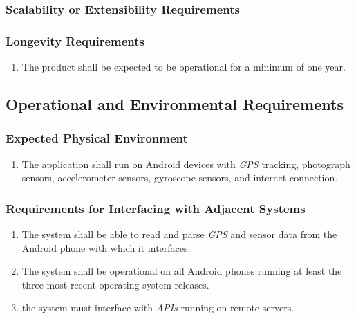 \documentclass[12pt,letterpaper]{article}
\begin{document}
\subsubsection{Scalability or Extensibility Requirements}
\label{ssub:scalability_or_extensibility_requirements}

\subsubsection{Longevity Requirements}
\label{ssub:longevity_requirements}
\begin{enumerate}[{PR-L}1. ]
	\item The product shall be expected to be operational for a minimum of one year.
\end{enumerate}


\subsection{Operational and Environmental Requirements}
\label{sub:operational_and_environmental_requirements}

\subsubsection{Expected Physical Environment}
\label{ssub:expected_physical_environment}
\begin{enumerate}[{OE-E}1. ]
	\item The application shall run on Android devices with \textit{GPS} tracking, photograph sensors, accelerometer sensors, gyroscope sensors, and internet connection.
\end{enumerate}

\subsubsection{Requirements for Interfacing with Adjacent Systems}
\label{ssub:requirements_for_interfacing_with_adjacent_systems}
\begin{enumerate}[{OE-I}1. ]
	\item The system shall be able to read and parse \textit{GPS} and sensor data from the Android phone with which it interfaces.
	
	\item The system shall be operational on all Android phones running at least the three most recent operating system releases.
	
	\item the system must interface with \textit{APIs} running on remote servers.
\end{enumerate}
\end{document}
